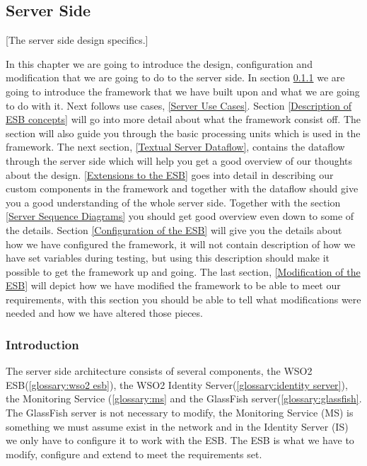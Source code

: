     \subsection{Server Side}\label{Server Side Design} [The server side design specifics.]

    In this chapter we are going to introduce the design, configuration and modification that we are going to do to the server side. In section \ref{Server Introduction} we are going to introduce the framework that we have built upon and what we are going to do with it. Next follows use cases, \ref{Server Use Cases}. Section \ref{Description of ESB concepts} will go into more detail about what the framework consist off. The section will also guide you through the basic processing units which is used in the framework. The next section, \ref{Textual Server Dataflow}, contains the dataflow through the server side which will help you get a good overview of our thoughts about the design. \ref{Extensions to the ESB} goes into detail in describing our custom components in the framework and together with the dataflow should give you a good understanding of the whole server side. Together with the section \ref{Server Sequence Diagrams} you should get good overview even down to some of the details. Section \ref{Configuration of the ESB} will give you the details about how we have configured the framework, it will not contain description of how we have set variables during testing, but using this description should make it possible to get the framework up and going. The last section, \ref{Modification of the ESB} will depict how we have modified the framework to be able to meet our requirements, with this section you should be able to tell what modifications were needed and how we have altered those pieces. 

    \subsubsection{Introduction}\label{Server Introduction}
    The server side architecture consists of several components, the WSO2 ESB(\ref{glossary:wso2 esb}), the WSO2 Identity Server(\ref{glossary:identity server}), the Monitoring Service (\ref{glossary:ms} and the GlassFish server(\ref{glossary:glassfish}. The GlassFish server is not necessary to modify, the Monitoring Service (MS) is something we must assume exist in the network and in the Identity Server (IS) we only have to configure it to work with the ESB. The ESB is what we have to modify, configure and extend to meet the requirements set.

